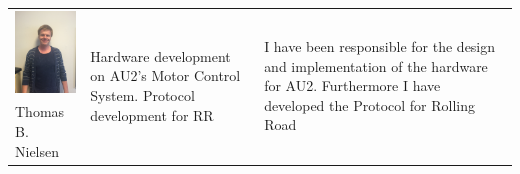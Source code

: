 \begin{tabular}[c]{|p{3cm}| p{5cm} | p{6cm}|}
	\phantom{Test}                                                                                                                                                                                                                                                      
	\includegraphics[width=3cm]{Introduction/TeamPictures/ThomasN} & \multirow{2}{5cm}{Hardware development on AU2's Motor Control System. \newline \newline Protocol development for RR} & \multirow{2}{6cm}{I have been responsible for the design and implementation of the hardware for AU2. Furthermore I have developed the Protocol for Rolling Road} \\
	Thomas B. \newline Nielsen & & \\ \hline
\end{tabular}